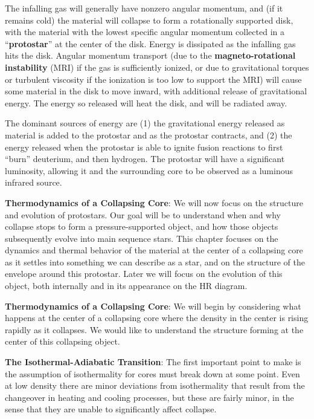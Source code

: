 \documentclass[a4paper,10pt]{article}
\begin{document}
{\noindent}The infalling gas will generally have nonzero angular momentum, and (if it remains cold) the material will collapse to form a rotationally supported disk, with the material with the lowest specific angular momentum collected in a ``\textbf{protostar}'' at the center of the disk. Energy is dissipated as the infalling gas hits the disk. Angular momentum transport (due to the \textbf{magneto-rotational instability} (MRI) if the gas is sufficiently ionized, or due to gravitational torques or turbulent viscosity if the ionization is too low to support the MRI) will cause some material in the disk to move inward, with additional release of gravitational energy. The energy so released will heat the disk, and will be radiated away.

{\noindent}The dominant sources of energy are (1) the gravitational energy released as material is added to the protostar and as the protostar contracts, and (2) the energy released when the protostar is able to ignite fusion reactions to first ``burn'' deuterium, and then hydrogen. The protostar will have a significant luminosity, allowing it and the surrounding core to be observed as a luminous infrared source.

{\noindent}\textbf{Thermodynamics of a Collapsing Core}: We will now focus on the structure and evolution of protostars. Our goal will be to understand when and why collapse stops to form a pressure-supported object, and how those objects subsequently evolve into main sequence stars. This chapter focuses on
the dynamics and thermal behavior of the material at the center of a collapsing core as it settles into something we can describe as a star, and on the structure of the envelope around this protostar. Later we will focus on the evolution of this object, both internally and in its appearance on the HR diagram.

{\noindent}\textbf{Thermodynamics of a Collapsing Core}: We will begin by considering what happens at the center of a collapsing core where the density in the center is rising rapidly as it collapses. We would like to understand the structure forming at the center of this collapsing object.

{\noindent}\textbf{The Isothermal-Adiabatic Transition}: The first important point to make is the assumption of isothermality for cores must break down at some point. Even at low density there are minor deviations from isothermality that result from the changeover in heating and cooling processes, but these are fairly minor, in the sense that they are unable to significantly affect collapse. 
\end{document}
